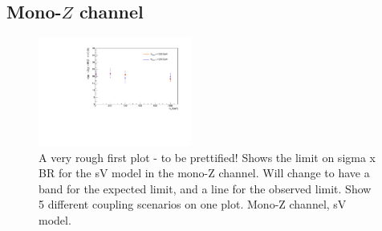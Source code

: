 \subsection{Mono-$Z$ channel}

\begin{figure}[!h]
\begin{center}
\includegraphics[width=0.45\textwidth]{figures/monoZ_sigma_limits_variedDMmass.pdf}
\caption{A very rough first plot - to be prettified! Shows the limit on sigma x BR for the sV model in the mono-Z channel. Will change to have a band for the expected limit, and a line for the observed limit. Show 5 different coupling scenarios on one plot. Mono-Z channel, sV model.}
\label{fig:MonoZ_SVD_limit}
\end{center}
\end{figure}

